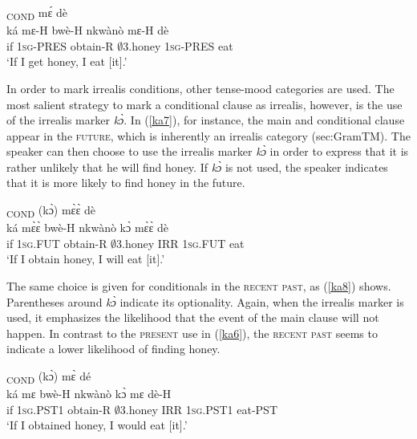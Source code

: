 \begin{exe}
\ex\label{ka6}
  \textsubscript{COND} mɛ́ dè \\
       ká mɛ-H bwè-H nkwànò mɛ-H dè \\
       if 1\textsc{sg}-PRES obtain-R $\emptyset$3.honey 1\textsc{sg}-PRES eat \\ 
 \trans `If I get honey, I eat [it].'
\end{exe}

In order to mark irrealis conditions, other tense-mood categories are used.
The most salient strategy to mark a conditional clause as irrealis, however, is the use of the irrealis marker {\itshape kɔ̀}. In (\ref{ka7}), for instance, the main and conditional clause appear in the \textsc{future}, which is inherently an irrealis category ({sec:GramTM}). The speaker can then choose to use the irrealis marker {\itshape kɔ̀} in order to express that it is rather unlikely that he will find honey. If {\itshape kɔ̀} is not used, the speaker indicates that it is more likely to find honey in the future.

\begin{exe}
\ex\label{ka7}
  \textsubscript{COND} (kɔ̀) mɛ̀ɛ̀ dè \\
       ká mɛ̀ɛ̀ bwè-H nkwànò kɔ̀ mɛ̀ɛ̀ dè\\
       if 1\textsc{sg}.FUT obtain-R $\emptyset$3.honey IRR 1\textsc{sg}.FUT eat \\ 
 \trans `If I obtain honey, I will eat [it].'
\end{exe}

The same choice is given for conditionals in the \textsc{recent past}, as (\ref{ka8}) shows. Parentheses around {\itshape kɔ̀} indicate its optionality. Again, when the irrealis marker is used, it emphasizes the likelihood that the event of the main clause will not happen. In contrast to the \textsc{present} use in (\ref{ka6}), the \textsc{recent past} seems to indicate a lower likelihood of finding honey. 

\begin{exe}
\ex\label{ka8}
  \textsubscript{COND} (kɔ̀) mɛ̀ dé \\
       ká mɛ bwè-H nkwànò kɔ̀ mɛ dè-H \\
       if 1\textsc{sg}.PST1 obtain-R $\emptyset$3.honey IRR 1\textsc{sg}.PST1 eat-PST \\ 
 \trans `If I obtained honey, I would eat [it].'
\end{exe}

